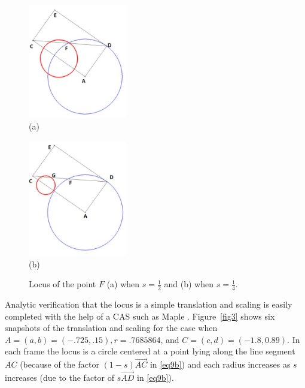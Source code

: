 \documentclass[12pt,a4paper]{article}%
\begin{document}
\begin{figure}[htpb]
\begin{center}
\parbox[b]{1.7in}{\begin{center}
\includegraphics[width=1.7in,keepaspectratio]{Figure6-crop.pdf}
 \\ (a)
\end{center}}
\qquad
\parbox[b]{1.7in}{\begin{center}
\includegraphics[width=1.7in,keepaspectratio]{Figure7-crop.pdf}
 \\ (b)
\end{center}}
\end{center}
\caption{Locus of the point $F$ (a) when $s=\frac{1}{2}$ and (b) when $s=\frac{1}{4}$.}
\label{fig2}
\end{figure}

Analytic verification that the locus is a simple translation and scaling
is easily completed with the help of a CAS such as Maple \cite{Maple}.
Figure~\ref{fig3} shows six snapshots of the translation and scaling
for the case when $A=(a,b)=(-.725,.15),r=.7685864$, and $C=(c,d)=(-1.8,0.89)$.
In each frame the locus is a circle centered at a point lying along
the line segment $AC$ (because of the factor $(1-s) \overrightarrow{AC}$
in \ref{eq9b}) and
each radius increases as $s$ increases (due to the
factor of $s \overrightarrow{AD}$ in \ref{eq9b}).
\end{document}
